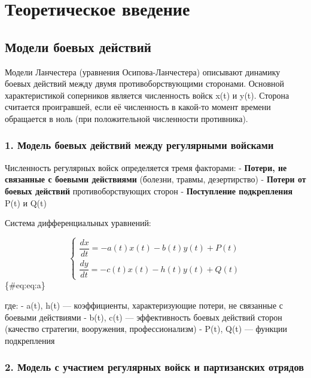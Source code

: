 \documentclass[
  12pt,
  a4paper,
  DIV=11,
  numbers=noendperiod]{scrreprt}
\begin{document}
\chapter{Теоретическое
введение}\label{ux442ux435ux43eux440ux435ux442ux438ux447ux435ux441ux43aux43eux435-ux432ux432ux435ux434ux435ux43dux438ux435}

\section{Модели боевых
действий}\label{ux43cux43eux434ux435ux43bux438-ux431ux43eux435ux432ux44bux445-ux434ux435ux439ux441ux442ux432ux438ux439}

Модели Ланчестера (уравнения Осипова-Ланчестера) описывают динамику
боевых действий между двумя противоборствующими сторонами. Основной
характеристикой соперников является численность войск x(t) и y(t).
Сторона считается проигравшей, если её численность в какой-то момент
времени обращается в ноль (при положительной численности противника).

\subsection{1. Модель боевых действий между регулярными
войсками}\label{ux43cux43eux434ux435ux43bux44c-ux431ux43eux435ux432ux44bux445-ux434ux435ux439ux441ux442ux432ux438ux439-ux43cux435ux436ux434ux443-ux440ux435ux433ux443ux43bux44fux440ux43dux44bux43cux438-ux432ux43eux439ux441ux43aux430ux43cux438}

Численность регулярных войск определяется тремя факторами: -
\textbf{Потери, не связанные с боевыми действиями} (болезни, травмы,
дезертирство) - \textbf{Потери от боевых действий} противоборствующих
сторон - \textbf{Поступление подкрепления} P(t) и Q(t)

Система дифференциальных уравнений:

\[
\begin{cases}
\dfrac{dx}{dt} = -a(t)x(t) - b(t)y(t) + P(t) \\
\dfrac{dy}{dt} = -c(t)x(t) - h(t)y(t) + Q(t)
\end{cases}
\]\{\#eq:eq:a\}

где: - a(t), h(t) --- коэффициенты, характеризующие потери, не связанные
с боевыми действиями - b(t), c(t) --- эффективность боевых действий
сторон (качество стратегии, вооружения, профессионализм) - P(t), Q(t)
--- функции подкрепления

\subsection{2. Модель с участием регулярных войск и партизанских
отрядов}\label{ux43cux43eux434ux435ux43bux44c-ux441-ux443ux447ux430ux441ux442ux438ux435ux43c-ux440ux435ux433ux443ux43bux44fux440ux43dux44bux445-ux432ux43eux439ux441ux43a-ux438-ux43fux430ux440ux442ux438ux437ux430ux43dux441ux43aux438ux445-ux43eux442ux440ux44fux434ux43eux432}
\end{document}
